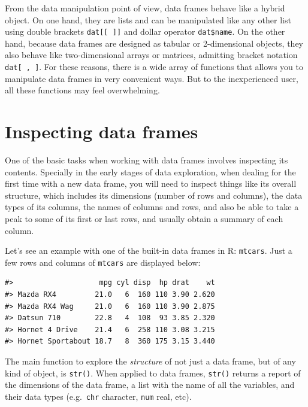\documentclass[
]{book}
\begin{document}
From the data manipulation point of view, data frames behave like a hybrid
object. On one hand, they are lists and can be manipulated like any other list
using double brackets \texttt{dat{[}{[}\ {]}{]}} and dollar operator \texttt{dat\$name}.
On the other hand, because data frames are designed as tabular or 2-dimensional
objects, they also behave like two-dimensional arrays or matrices, admitting
bracket notation \texttt{dat{[}\ ,\ {]}}. For these reasons, there is a wide array of
functions that allows you to manipulate data frames in very convenient ways.
But to the inexperienced user, all these functions may feel overwhelming.

\hypertarget{inspecting-data-frames}{%
\section{Inspecting data frames}\label{inspecting-data-frames}}

One of the basic tasks when working with data frames involves inspecting its
contents. Specially in the early stages of data exploration, when dealing for
the first time with a new data frame, you will need to inspect things like
its overall structure, which includes its dimensions (number of rows and
columns), the data types of its columns, the names of columns and rows, and
also be able to take a peak to some of its first or last rows, and usually
obtain a summary of each column.

Let's see an example with one of the built-in data frames in R: \texttt{mtcars}.
Just a few rows and columns of \texttt{mtcars} are displayed below:

\begin{verbatim}
#>                    mpg cyl disp  hp drat    wt
#> Mazda RX4         21.0   6  160 110 3.90 2.620
#> Mazda RX4 Wag     21.0   6  160 110 3.90 2.875
#> Datsun 710        22.8   4  108  93 3.85 2.320
#> Hornet 4 Drive    21.4   6  258 110 3.08 3.215
#> Hornet Sportabout 18.7   8  360 175 3.15 3.440
\end{verbatim}

The main function to explore the \emph{structure} of not just a data frame, but of
any kind of object, is \texttt{str()}. When applied to data frames, \texttt{str()} returns a
report of the dimensions of the data frame, a list with the name of all the
variables, and their data types (e.g.~\texttt{chr} character, \texttt{num} real, etc).
\end{document}
